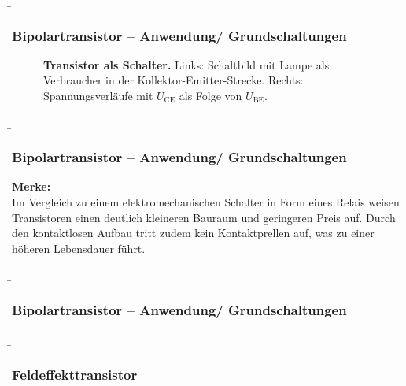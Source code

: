 \begin{frame}
     \b{ \frametitle{Bipolartransistor -- Anwendung/ Grundschaltungen}
         \begin{figure}[H]
            \caption{\textbf{Transistor als Schalter.} Links: Schaltbild mit Lampe als Verbraucher in der Kollektor-Emitter-Strecke. Rechts: 
            Spannungsverläufe mit $U_\mathrm{CE}$ als Folge von $U_\mathrm{BE}$.} 
        \end{figure}
     }
\end{frame}

\begin{frame}
    \b{\frametitle{Bipolartransistor -- Anwendung/ Grundschaltungen}
        \textbf{Merke:} \\
        Im Vergleich zu einem elektromechanischen Schalter in Form eines Relais weisen Transistoren einen 
        deutlich kleineren Bauraum und geringeren Preis auf. Durch den kontaktlosen Aufbau tritt zudem kein 
        Kontaktprellen auf, was zu einer höheren Lebensdauer führt.
        }
\end{frame}

\begin{frame}
    \b{ \frametitle{Bipolartransistor -- Anwendung/ Grundschaltungen}
        \begin{figure}[H]
            \centering
            
        \end{figure}}
\end{frame}

\begin{frame}
    \b{ \frametitle{Feldeffekttransistor}
    \begin{figure}[H]
        \centering
        \scalebox{0.9}{}
    \end{figure}
    }
\end{frame}

